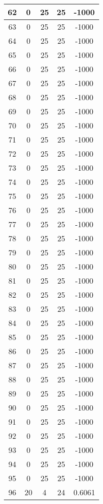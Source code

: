 \documentclass[letterpaper, 12pt]{article}
\begin{document}
\begin{longtable}{|c|c|c|c|c|}
\hline
62 & 0 & 25 & 25 & -1000 \\
\hline
63 & 0 & 25 & 25 & -1000 \\
\hline
64 & 0 & 25 & 25 & -1000 \\
\hline
65 & 0 & 25 & 25 & -1000 \\
\hline
66 & 0 & 25 & 25 & -1000 \\
\hline
67 & 0 & 25 & 25 & -1000 \\
\hline
68 & 0 & 25 & 25 & -1000 \\
\hline
69 & 0 & 25 & 25 & -1000 \\
\hline
70 & 0 & 25 & 25 & -1000 \\
\hline
71 & 0 & 25 & 25 & -1000 \\
\hline
72 & 0 & 25 & 25 & -1000 \\
\hline
73 & 0 & 25 & 25 & -1000 \\
\hline
74 & 0 & 25 & 25 & -1000 \\
\hline
75 & 0 & 25 & 25 & -1000 \\
\hline
76 & 0 & 25 & 25 & -1000 \\
\hline
77 & 0 & 25 & 25 & -1000 \\
\hline
78 & 0 & 25 & 25 & -1000 \\
\hline
79 & 0 & 25 & 25 & -1000 \\
\hline
80 & 0 & 25 & 25 & -1000 \\
\hline
81 & 0 & 25 & 25 & -1000 \\
\hline
82 & 0 & 25 & 25 & -1000 \\
\hline
83 & 0 & 25 & 25 & -1000 \\
\hline
84 & 0 & 25 & 25 & -1000 \\
\hline
85 & 0 & 25 & 25 & -1000 \\
\hline
86 & 0 & 25 & 25 & -1000 \\
\hline
87 & 0 & 25 & 25 & -1000 \\
\hline
88 & 0 & 25 & 25 & -1000 \\
\hline
89 & 0 & 25 & 25 & -1000 \\
\hline
90 & 0 & 25 & 25 & -1000 \\
\hline
91 & 0 & 25 & 25 & -1000 \\
\hline
92 & 0 & 25 & 25 & -1000 \\
\hline
93 & 0 & 25 & 25 & -1000 \\
\hline
94 & 0 & 25 & 25 & -1000 \\
\hline
95 & 0 & 25 & 25 & -1000 \\
\hline
96 & 20 & 4 & 24 & 0.6061 \\

\end{longtable}
\end{document}
